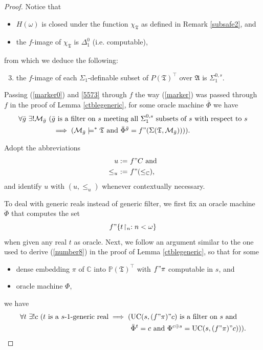 \documentclass[12pt, twoside]{memoir}
\numberwithin{equation}{section}
\theoremstyle{definition}
\theoremstyle{remark}
\theoremstyle{definition}
\theoremstyle{definition}
\theoremstyle{definition}
\theoremstyle{remark}
\begin{document}
\begin{proof}
Notice that
\begin{itemize}
    \item $H(\omega)$ is closed under the function $\chi_{\mathfrak{T}}$ as defined in Remark \ref{subsafe2}, and 
    \item the $f$-image of $\chi_{\mathfrak{T}}$ is $\Delta^0_1$ (i.e. computable),
\end{itemize} 
from which we deduce the following:
\begin{enumerate}[label=(\Roman*)]
    \setcounter{enumi}{2}
    \item\label{5573} the $f$-image of each $\Sigma_1$-definable subset of $P(\mathfrak{T})^{\top}$ over $\mathfrak{A}$ is $\Sigma^{0, s}_1$.
\end{enumerate}

Passing (\ref{marker0}) and \ref{5573} through $f$ the way (\ref{marker}) was passed through $f$ in the proof of Lemma \ref{ctblegeneric}, for some oracle machine $\bar{\Phi}$ we have
\begin{align}\label{number9}
\begin{split}
    \forall \bar{g} \ \exists ! \mathcal{M}_{\bar{g}} \ ( & \bar{g} \text{ is a filter on } s \text{ meeting all } \Sigma^{0, s}_1 \text{ subsets of } s \text{ with respect to } s \\
    & \implies (\mathcal{M}_{\bar{g}} \models^* \mathfrak{T} \text{ and } \bar{\Phi}^{\bar{g}} = f" (\Sigma(\mathfrak{T}, \mathcal{M}_{\bar{g}})))) \text{.}
\end{split}
\end{align}

Adopt the abbreviations
\begin{align*}
    u := \ & f" C \text{ and} \\
    \leq_u \ := \ & f" (\leq_{\mathbb{C}}) \text{,}
\end{align*}
and identify $u$ with $(u, \leq_u)$ whenever contextually necessary. 

To deal with generic reals instead of generic filter, we first fix an oracle machine $\ddot{\Phi}$ that computes the set $$f" \{t \! \restriction_n : n < \omega\}$$ when given any real $t$ as oracle. Next, we follow an argument similar to the one used to derive (\ref{number8}) in the proof of Lemma \ref{ctblegeneric}, so that for some 
\begin{itemize}
    \item dense embedding $\pi$ of $\mathbb{C}$ into $\mathbb{P}(\mathfrak{T})^{\top}$ with $f" \pi$ computable in $s$, and 
    \item oracle machine $\Phi$, 
\end{itemize}
we have
\begin{align}\label{number10}
\begin{split}
    \forall t \ \exists ! c \ (t \text{ is a } s \text{-} 1 \text{-generic real} \implies ( & \mathrm{UC}(s, (f" \pi)" c) \text{ is a filter on } s \text{ and} \\
    & \ddot{\Phi}^t = c \text{ and } \Phi^{c \oplus s} = \mathrm{UC}(s, (f" \pi)" c))) \text{.}
\end{split}
\end{align}


\end{proof}
\end{document}
